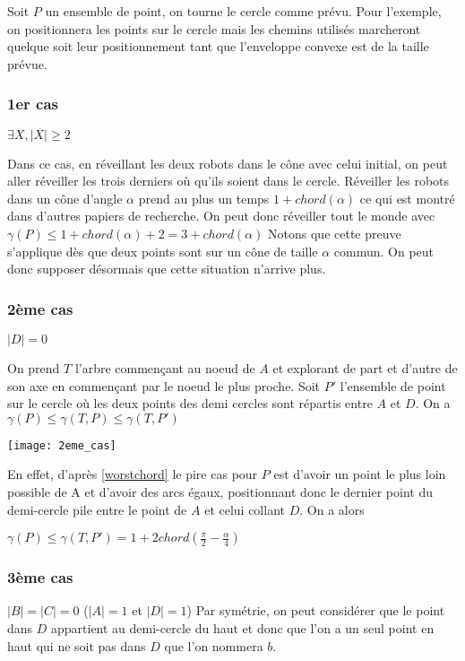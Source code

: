 Soit $P$ un ensemble de point, on tourne le cercle comme prévu. Pour l'exemple,
on positionnera les points sur le cercle mais les chemins utilisés marcheront
quelque soit leur positionnement tant que l'enveloppe convexe est de la taille
prévue.

\subsubsection*{1er cas} $\exists X, |X| \geq 2$

Dans ce cas, en réveillant les deux robots dans le cône avec celui initial, on peut aller réveiller les trois derniers où qu'ils soient dans le cercle. Réveiller les robots dans un cône d'angle $\alpha$ prend au plus un temps $1 + chord(\alpha)$ ce qui est montré dans d'autres papiers de recherche.
On peut donc réveiller tout le monde avec $\gamma(P) \leq 1 + chord(\alpha) + 2 = 3 + chord(\alpha)$
Notons que cette preuve s'applique dès que deux points sont sur un cône de taille $\alpha$ commun. On peut donc supposer désormais que cette situation n'arrive plus.

\subsubsection*{2ème cas} $|D| = 0$

On prend $T$ l'arbre commençant au noeud de $A$ et explorant de part et d'autre de son axe en commençant par le noeud le plus proche.
Soit $P'$ l'ensemble de point sur le cercle où les deux points des demi cercles sont répartis entre $A$ et $D$.
On a $\gamma(P) \leq  \gamma(T, P) \leq \gamma(T, P')$

\texttt{[image: 2eme\_cas]}

En effet, d'après \ref{worstchord} le pire cas pour $P$ est d'avoir un point le plus loin possible de A et d'avoir des arcs égaux, positionnant donc le dernier point du demi-cercle pile entre le point de $A$ et celui collant $D$. On a alors

$\gamma(P) \leq \gamma(T, P') = 1 + 2chord(\frac{\pi}{2} - \frac{\alpha}{4})$

\subsubsection*{3ème cas} $|B| = |C| = 0$ ($|A| = 1$ et $|D| = 1$)
Par symétrie, on peut considérer que le point dans $D$ appartient au demi-cercle du haut et donc que l'on a un seul point en haut qui ne soit pas dans $D$ que l'on nommera $b$.

